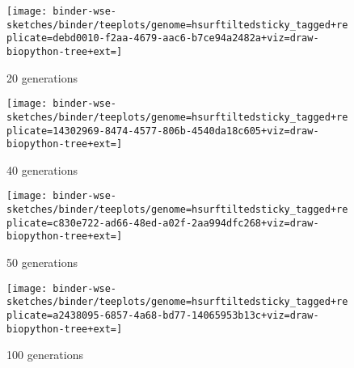 \begin{figure*}
  \begin{subfigure}[b]{\textwidth}
    \centering
    \texttt{[image: binder-wse-sketches/binder/teeplots/genome=hsurftiltedsticky\_tagged+replicate=debd0010-f2aa-4679-aac6-b7ce94a2482a+viz=draw-biopython-tree+ext=]}
    \caption{20 generations}
    \label{fig:tagged_other}
  \end{subfigure}

  \begin{subfigure}[b]{\textwidth}
    \centering
    \texttt{[image: binder-wse-sketches/binder/teeplots/genome=hsurftiltedsticky\_tagged+replicate=14302969-8474-4577-806b-4540da18c605+viz=draw-biopython-tree+ext=]}
    \caption{40 generations}
    \label{fig:tagged_other}
  \end{subfigure}

  \begin{subfigure}[b]{\textwidth}
    \centering
    \texttt{[image: binder-wse-sketches/binder/teeplots/genome=hsurftiltedsticky\_tagged+replicate=c830e722-ad66-48ed-a02f-2aa994dfc268+viz=draw-biopython-tree+ext=]}
    \caption{50 generations}
    \label{fig:tagged_other}
  \end{subfigure}

  \begin{subfigure}[b]{\textwidth}
    \centering
    \texttt{[image: binder-wse-sketches/binder/teeplots/genome=hsurftiltedsticky\_tagged+replicate=a2438095-6857-4a68-bd77-14065953b13c+viz=draw-biopython-tree+ext=]}
    \caption{100 generations}
    \label{fig:tagged_other}
  \end{subfigure}
\end{figure*}
